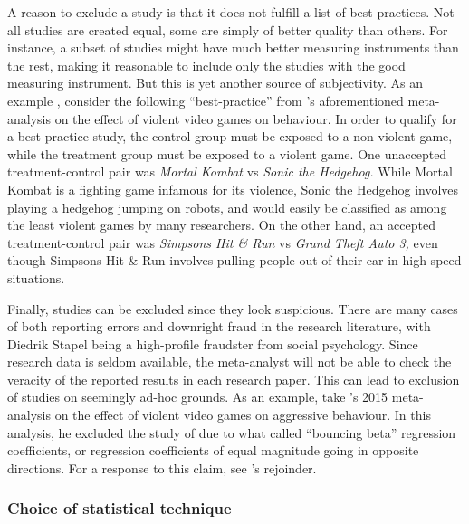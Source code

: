 A reason to exclude a study is that it does not fulfill a list of
best practices. Not all studies are created equal, some are simply
of better quality than others. For instance, a subset of studies might
have much better measuring instruments than the rest, making it reasonable
to include only the studies with the good measuring instrument. But
this is yet another source of subjectivity. As an example \parencite[taken from][p. 6]{lakens_reproducibility_2016},
consider the following ``best-practice'' from \cite{anderson_violent_2010}'s
aforementioned meta-analysis on the effect of violent video games
on behaviour. In order to qualify for a best-practice study, the control
group must be exposed to a non-violent game, while the treatment group
must be exposed to a violent game. One unaccepted treatment-control
pair was \emph{Mortal Kombat} vs \emph{Sonic the Hedgehog.} While
Mortal Kombat is a fighting game infamous for its violence, Sonic
the Hedgehog involves playing a hedgehog jumping on robots, and would
easily be classified as among the least violent games by many researchers.
On the other hand, an accepted treatment-control pair was \emph{Simpsons
Hit \& Run }vs \emph{Grand Theft Auto 3, }even though Simpsons Hit
\& Run involves pulling people out of their car in high-speed situations. 

Finally, studies can be excluded since they look suspicious. There
are many cases of both reporting errors \parencite{nuijten_prevalence_2016}
and downright fraud in the research literature, with Diedrik Stapel
being a high-profile fraudster from social psychology. Since research
data is seldom available, the meta-analyst will not be able to check
the veracity of the reported results in each research paper. This
can lead to exclusion of studies on seemingly ad-hoc grounds. As an
example, take \citeauthor{ferguson_angry_2015}'s 2015 meta-analysis
on the effect of violent video games on aggressive behaviour. In this
analysis, he excluded the study of \cite{gentile_effects_2009} due
to what \cite{ferguson_angry_2015} called ``bouncing beta'' regression
coefficients, or regression coefficients of equal magnitude going
in opposite directions. For a response to this claim, see \cite{gentile_what_2015}'s
rejoinder.

\subsubsection{Choice of statistical technique}

